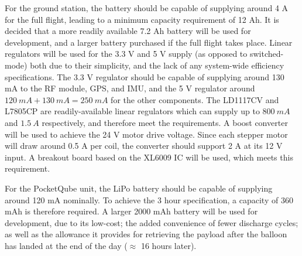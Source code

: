For the ground station, the battery should be capable of supplying around 4 A for the full flight, leading to a minimum capacity requirement of 12 Ah. It is decided that a more readily available 7.2 Ah battery will be used for development, and a larger battery purchased if the full flight takes place. Linear regulators will be used for the 3.3 V and 5 V supply (as opposed to switched-mode) both due to their simplicity, and the lack of any system-wide efficiency specifications. The 3.3 V regulator should be capable of supplying around 130 mA to the RF module, GPS, and IMU, and the 5 V regulator around $\SI{120}{mA} + \SI{130}{mA} = \SI{250}{mA}$ for the other components. The LD1117CV and L7805CP are readily-available linear regulators which can supply up to $\SI{800}{mA}$ and $\SI{1.5}{A}$ respectively, and therefore meet the requirements. A boost converter will be used to achieve the 24 V motor drive voltage. Since each stepper motor will draw around 0.5 A per coil, the converter should support 2 A at its 12 V input. A breakout board based on the XL6009 IC will be used, which meets this requirement.

For the PocketQube unit, the LiPo battery should be capable of supplying around 120 mA nominally. To achieve the 3 hour specification, a capacity of 360 mAh is therefore required. A larger 2000 mAh battery will be used for development, due to its low-cost; the added convenience of fewer discharge cycles; as well as the allowance it provides for retrieving the payload after the balloon has landed at the end of the day ($\approx$ 16 hours later).